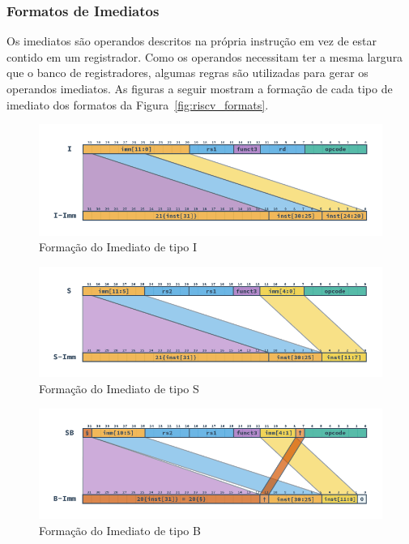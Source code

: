         \subsubsection{Formatos de Imediatos}
        {
            Os imediatos são operandos descritos na própria instrução em vez de estar
            contido em um registrador. Como os operandos necessitam ter a mesma largura
            que o banco de registradores, algumas regras são utilizadas para gerar os
            operandos imediatos. As figuras a seguir mostram a formação de cada tipo de
            imediato dos formatos da Figura~\ref{fig:riscv_formats}.
        }

        \begin{figure}[H]
        \centering
            \includegraphics[width=1\linewidth]{../images/RV_I_Imm.png}
            \caption{Formação do Imediato de tipo I
                }\label{fig:riscv_i_imm}
        \end{figure}

        \begin{figure}[H]
        \centering
            \includegraphics[width=1\linewidth]{../images/RV_S_Imm.png}
            \caption{Formação do Imediato de tipo S
                }\label{fig:riscv_s_imm}
        \end{figure}

        \begin{figure}[H]
        \centering
            \includegraphics[width=1\linewidth]{../images/RV_B_Imm.png}
            \caption{Formação do Imediato de tipo B
                }\label{fig:riscv_b_imm}
        \end{figure}

